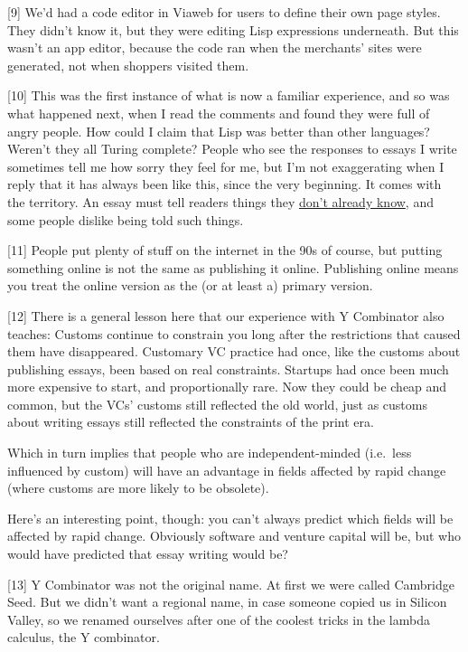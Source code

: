 {[}9{]} We'd had a code editor in Viaweb for users to define their own
page styles. They didn't know it, but they were editing Lisp expressions
underneath. But this wasn't an app editor, because the code ran when the
merchants' sites were generated, not when shoppers visited them.

{[}10{]} This was the first instance of what is now a familiar
experience, and so was what happened next, when I read the comments and
found they were full of angry people. How could I claim that Lisp was
better than other languages? Weren't they all Turing complete? People
who see the responses to essays I write sometimes tell me how sorry they
feel for me, but I'm not exaggerating when I reply that it has always
been like this, since the very beginning. It comes with the territory.
An essay must tell readers things they \href{useful.html}{don't already
know}, and some people dislike being told such things.

{[}11{]} People put plenty of stuff on the internet in the 90s of
course, but putting something online is not the same as publishing it
online. Publishing online means you treat the online version as the (or
at least a) primary version.

{[}12{]} There is a general lesson here that our experience with Y
Combinator also teaches: Customs continue to constrain you long after
the restrictions that caused them have disappeared. Customary VC
practice had once, like the customs about publishing essays, been based
on real constraints. Startups had once been much more expensive to
start, and proportionally rare. Now they could be cheap and common, but
the VCs' customs still reflected the old world, just as customs about
writing essays still reflected the constraints of the print era.

Which in turn implies that people who are independent-minded (i.e.~less
influenced by custom) will have an advantage in fields affected by rapid
change (where customs are more likely to be obsolete).

Here's an interesting point, though: you can't always predict which
fields will be affected by rapid change. Obviously software and venture
capital will be, but who would have predicted that essay writing would
be?

{[}13{]} Y Combinator was not the original name. At first we were called
Cambridge Seed. But we didn't want a regional name, in case someone
copied us in Silicon Valley, so we renamed ourselves after one of the
coolest tricks in the lambda calculus, the Y combinator.

